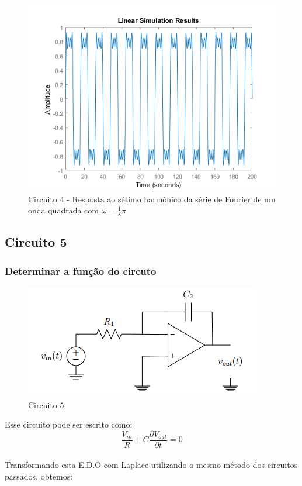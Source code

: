 \documentclass[a4paper, 12pt]{article}
\begin{document}
			\begin{figure}[!ht]
				\centering
				\includegraphics[scale=0.71]{img/1m_circ4.png}
				\caption{Circuito 4 - Resposta ao sétimo harmônico da série de Fourier de um onda quadrada com $\omega = \frac{1}{8}\pi$}
			\end{figure}
		\clearpage
		\subsection{Circuito 5}
			\subsubsection{Determinar a função do circuto}
			\begin{figure}[!ht]
				\centering
				\includegraphics{img/circuito5.png}
				\caption{Circuito 5}
			\end{figure}

			Esse circuito pode ser escrito  como:
			\[
			\frac{V_{in}}{R} + C\frac{\partial V_{out}}{\partial t} = 0
			\] 	\\

			Transformando esta E.D.O com Laplace utilizando o mesmo método dos circuitos passados, obtemos:
\end{document}
